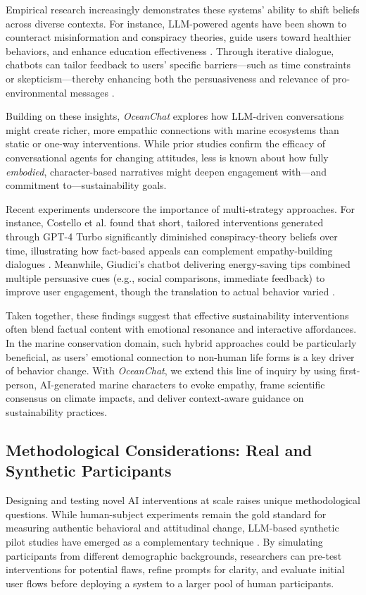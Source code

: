 \documentclass[sigconf, nonacm]{acmart}
\begin{document}
Empirical research increasingly demonstrates these systems’ ability to shift beliefs across diverse contexts. For instance, LLM-powered agents have been shown to counteract misinformation and conspiracy theories, guide users toward healthier behaviors, and enhance education effectiveness \cite{Wang2023, Aggarwal2023, Costello2024}. Through iterative dialogue, chatbots can tailor feedback to users’ specific barriers—such as time constraints or skepticism—thereby enhancing both the persuasiveness and relevance of pro-environmental messages \cite{Aggarwal2023, Giudici2024b}. 

Building on these insights, \textit{OceanChat} explores how LLM-driven conversations might create richer, more empathic connections with marine ecosystems than static or one-way interventions. While prior studies confirm the efficacy of conversational agents for changing attitudes, less is known about how fully \textit{embodied}, character-based narratives might deepen engagement with—and commitment to—sustainability goals.

Recent experiments underscore the importance of multi-strategy approaches. For instance, Costello et al. found that short, tailored interventions generated through GPT-4 Turbo significantly diminished conspiracy-theory beliefs over time, illustrating how fact-based appeals can complement empathy-building dialogues \cite{Costello2024}. Meanwhile, Giudici’s chatbot delivering energy-saving tips combined multiple persuasive cues (e.g., social comparisons, immediate feedback) to improve user engagement, though the translation to actual behavior varied \cite{Giudici2024}.

Taken together, these findings suggest that effective sustainability interventions often blend factual content with emotional resonance and interactive affordances. In the marine conservation domain, such hybrid approaches could be particularly beneficial, as users’ emotional connection to non-human life forms is a key driver of behavior change. With \textit{OceanChat}, we extend this line of inquiry by using first-person, AI-generated marine characters to evoke empathy, frame scientific consensus on climate impacts, and deliver context-aware guidance on sustainability practices.

\subsection{Methodological Considerations: Real and Synthetic Participants}
Designing and testing novel AI interventions at scale raises unique methodological questions. While human-subject experiments remain the gold standard for measuring authentic behavioral and attitudinal change, LLM-based synthetic pilot studies have emerged as a complementary technique \cite{SyntheticStudy2023, Long2024}. By simulating participants from different demographic backgrounds, researchers can pre-test interventions for potential flaws, refine prompts for clarity, and evaluate initial user flows before deploying a system to a larger pool of human participants.
\end{document}
